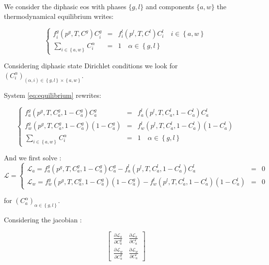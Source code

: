 \documentclass{article}
\begin{document}
We consider the diphasic eos with phases $\{g, l\}$ and components $\{a, w\}$ the thermodynamical equilibrium writes:

\begin{equation} \label{eq:equilibrium}
\left\{
\begin{array}{rcl}
f^g_i(p^g, T, C^g) C^g_i & = & f^l_i(p^l, T, C^l) C^l_i \quad i\in\left\{a, w\right\} \\
\sum_{i\in\left\{a, w\right\}} C^\alpha_i & = & 1 \quad \alpha \in\left\{g, l\right\}
\end{array}
\right.
\end{equation}

Considering diphasic state Dirichlet conditions we look for $\left(C^\alpha_i\right)_{\left(\alpha, i\right)\in\left\{g, l\right\}\times\left\{a, w\right\}}$.

System \eqref{eq:equilibrium} rewrites:

\begin{equation}
\left\{
\begin{array}{rcl}
f^g_a(p^g, T, C^g_a, 1 - C^g_a) C^g_a & = & f^l_a(p^l, T, C^l_a, 1 - C^l_a)C^l_a \\
f^g_w(p^g, T, C^g_a, 1 - C^g_a)\left(1 - C^g_a\right) & = & f^l_w(p^l, T, C^l_a, 1 - C^l_a)\left(1 - C^l_a\right) \\
\sum_{i\in\left\{a, w\right\}} C^\alpha_i & = & 1 \quad \alpha \in\left\{g, l\right\}
\end{array}
\right.
\end{equation}

And we first solve :
\begin{equation}
\mathcal{L} =
\left\{
\begin{array}{rcl}
\mathcal{L}_a = f^g_a(p^g, T, C^g_a, 1 - C^g_a) C^g_a -  f^l_a(p^l, T, C^l_a, 1 - C^l_a)C^l_a & = & 0 \\
\mathcal{L}_w = f^g_w(p^g, T, C^g_a, 1 - C^g_a)\left(1 - C^g_a\right) -  f^l_w(p^l, T, C^l_a, 1 - C^l_a)\left(1 - C^l_a\right) & = & 0
\end{array}
\right.
\end{equation}

for $\left(C^\alpha_a\right)_{\alpha\in\left\{g, l\right\}}$.

Considering the jacobian :

\begin{equation}
\left[
\begin{array}{cc}
\frac{\partial\mathcal{L}_a}{\partial C^g_a} & \frac{\partial\mathcal{L}_a}{\partial C^l_a} \\
\frac{\partial\mathcal{L}_w}{\partial C^g_a} & \frac{\partial\mathcal{L}_w}{\partial C^l_a}
\end{array}
\right]
\end{equation}
\end{document}
